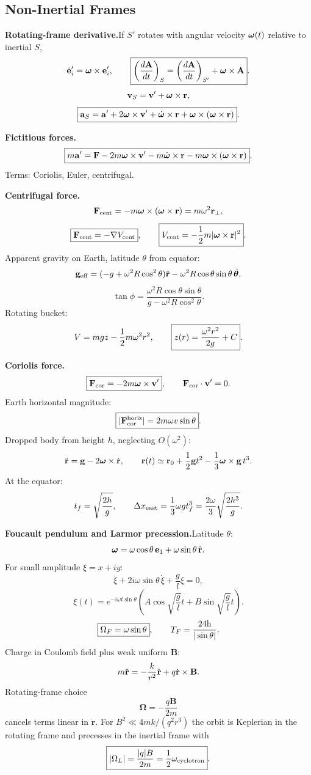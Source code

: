 \subsection{Non-Inertial Frames}

\noindent\textbf{Rotating-frame derivative.}\quad If $S'$ rotates with angular velocity
$\bm{\omega}(t)$ relative to inertial $S$,
\[
  \dot{\mathbf e}'_i=\bm{\omega}\times\mathbf e'_i,\qquad
  \boxed{\left(\frac{d\mathbf A}{dt}\right)_S
  =\left(\frac{d\mathbf A}{dt}\right)_{S'}+\bm{\omega}\times\mathbf A}.
\]
\[
  \mathbf v_S=\mathbf v'+\bm{\omega}\times\mathbf r,
\]
\[
  \boxed{\mathbf a_S=\mathbf a'+2\bm{\omega}\times\mathbf v'
  +\dot{\bm{\omega}}\times\mathbf r+\bm{\omega}\times(\bm{\omega}\times\mathbf r)}.
\]

\noindent\textbf{Fictitious forces.}\quad
\[
  \boxed{
  m\mathbf a'=\mathbf F
  -2m\bm{\omega}\times\mathbf v'
  -m\dot{\bm{\omega}}\times\mathbf r
  -m\bm{\omega}\times(\bm{\omega}\times\mathbf r)}.
\]
Terms: Coriolis, Euler, centrifugal. 

\noindent\textbf{Centrifugal force.}\quad
\[
  \mathbf F_{\rm cent}=-m\bm{\omega}\times(\bm{\omega}\times\mathbf r)=m\omega^2\mathbf r_\perp,
\]
\[
  \boxed{\mathbf F_{\rm cent}=-\nabla V_{\rm cent}},\qquad
  \boxed{V_{\rm cent}=-\frac{1}{2} m|\bm{\omega}\times\mathbf r|^2}.
\]
Apparent gravity on Earth, latitude $\theta$ from equator:
\[
  \mathbf g_{\rm eff}=(-g+\omega^2R\cos^2\theta)\hat{\mathbf r}
  -\omega^2R\cos\theta\sin\theta\,\hat{\boldsymbol\theta},
\]
\[
  \boxed{\tan\phi=
  \frac{\omega^2R\cos\theta\sin\theta}{g-\omega^2R\cos^2\theta}}.
\]
Rotating bucket:
\[
  V=mgz-\frac{1}{2} m\omega^2r^2,\qquad
  \boxed{z(r)=\frac{\omega^2r^2}{2g}+C}.
\]

\noindent\textbf{Coriolis force.}\quad
\[
  \boxed{\mathbf F_{\rm cor}=-2m\bm{\omega}\times\mathbf v'},\qquad
  \mathbf F_{\rm cor}\cdot\mathbf v'=0.
\]
Earth horizontal magnitude:
\[
  \boxed{|\mathbf F_{\rm cor}^{\rm horiz}|=2m\omega v\sin\theta}.
\]
Dropped body from height $h$, neglecting $O(\omega^2)$:
\[
  \ddot{\mathbf r}=\mathbf g-2\bm{\omega}\times\dot{\mathbf r},
\qquad
  \mathbf r(t)\simeq\mathbf r_0+\frac{1}{2}\mathbf g t^2-\frac13\bm{\omega}\times\mathbf g\,t^3.
\]
At the equator:
\[
  t_f=\sqrt{\frac{2h}{g}},\qquad
  \Delta x_{\rm east}=\frac13\omega g t_f^3
  =\frac{2\omega}{3}\sqrt{\frac{2h^3}{g}}.
\]

\noindent\textbf{Foucault pendulum and Larmor precession.}\quad Latitude $\theta$:
\[
  \bm{\omega}=\omega\cos\theta\,\mathbf e_1+\omega\sin\theta\,\hat{\mathbf r}.
\]
For small amplitude $\xi=x+iy$:
\[
  \boxed{\ddot\xi+2i\omega\sin\theta\,\dot\xi+\frac{g}{l}\xi=0},
\]
\[
  \boxed{\xi(t)=e^{-i\omega t\sin\theta}
  \left(A\cos\sqrt{\frac{g}{l}}t+B\sin\sqrt{\frac{g}{l}}t\right)}.
\]
\[
  \boxed{\Omega_F=\omega\sin\theta},\qquad
  T_F=\frac{24{\rm h}}{|\sin\theta|}.
\]
Charge in Coulomb field plus weak uniform $\mathbf B$:
\[
  m\ddot{\mathbf r}=-\frac{k}{r^2}\hat{\mathbf r}+q\dot{\mathbf r}\times\mathbf B.
\]
Rotating-frame choice
\[
  \boxed{\bm\Omega=-\frac{q\mathbf B}{2m}}
\]
cancels terms linear in $\dot{\mathbf r}$. For
$B^2\ll4mk/(q^2r^3)$ the orbit is Keplerian in the rotating frame and precesses
in the inertial frame with
\[
  \boxed{|\Omega_L|=\frac{|q|B}{2m}=\frac{1}{2}\omega_{\rm cyclotron}}.
\]

